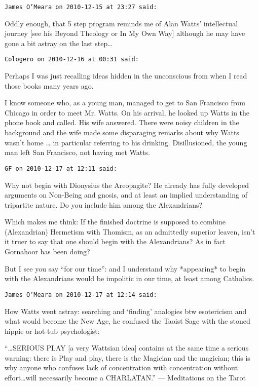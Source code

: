 \begin{footnotesize}\begin{sffamily}
\texttt{James O'Meara on 2010-12-15 at 23:27 said: }

Oddly enough, that 5 step program reminds me of Alan Watts' intellectual journey [see his Beyond Theology or In My Own Way] although he may have gone a bit astray on the last step…


\hfill

\texttt{Cologero on 2010-12-16 at 00:31 said: }

Perhaps I was just recalling ideas hidden in the unconscious from when I read those books many years ago.

I know someone who, as a young man, managed to get to San Francisco from Chicago in order to meet Mr. Watts. On his arrival, he looked up Watts in the phone book and called. His wife answered. There were noisy children in the background and the wife made some disparaging remarks about why Watts wasn't home … in particular referring to his drinking. Disillusioned, the young man left San Francisco, not having met Watts.


\hfill

\texttt{GF on 2010-12-17 at 12:11 said: }

Why not begin with Dionysius the Areopagite? He already has fully developed arguments on Non-Being and gnosis, and at least an implied understanding of tripartite nature. Do you include him among the Alexandrians? 

Which makes me think: If the finished doctrine is supposed to combine (Alexandrian) Hermetism with Thomism, as an admittedly superior leaven, isn't it truer to say that one should begin with the Alexandrians? As in fact Gornahoor has been doing?

But I see you say “for our time”: and I understand why *appearing* to begin with the Alexandrians would be impolitic in our time, at least among Catholics.


\hfill

\texttt{James O'Meara on 2010-12-17 at 12:14 said: }

How Watts went astray: searching and `finding' analogies btw esotericism and what would become the New Age, he confused the Taoist Sage with the stoned hippie or hot-tub psychologist:

“…SERIOUS PLAY [a very Wattsian idea] contains at the same time a serious warning: there is Play and play, there is the Magician and the magician; this is why anyone who confuses lack of concentration with concentration without effort…will necessarily become a CHARLATAN.” — Meditations on the Tarot



\end{sffamily}
\end{footnotesize}
